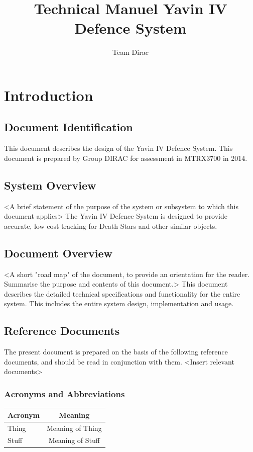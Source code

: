\documentclass[]{report}
\title{Technical Manuel \newline Yavin IV Defence System}
\author{Team Dirac}
\begin{document}
\maketitle

\chapter{Introduction}
\section{Document Identification}
This document describes the design of the Yavin IV Defence System. This document is prepared by Group DIRAC for assessment in MTRX3700 in 2014.

\section{System Overview}
<A brief statement of the purpose of the system or subsystem to which this document applies>
The Yavin IV Defence System is designed to provide accurate, low cost tracking for Death Stars and other similar objects.

\section{Document Overview}
<A short "road map" of the document, to provide an orientation for the reader. Summarise the purpose and contents of this document.>
This document describes the detailed technical specifications and functionality for the entire system. This includes the entire system design, implementation and usage.

\section{Reference Documents}
The present document is prepared on the basis of the following reference documents, and should be read in conjunction with them.
	<Insert relevant documents>
\subsection{Acronyms and Abbreviations}


\begin{center}
	\begin{tabular}{| l | c |}
		\hline
		Acronym & Meaning \\ \hline \hline
		Thing & Meaning of Thing \\ \hline
		Stuff & Meaning of Stuff \\
		\hline
	\end{tabular}
\end{center}
\end{document}
